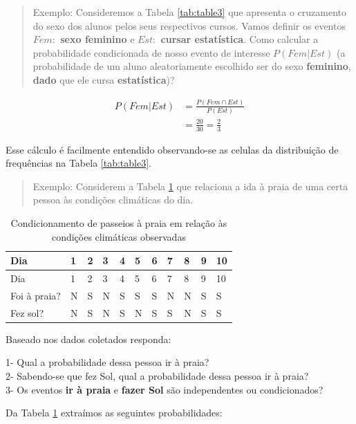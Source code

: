 \documentclass[
]{book}
\begin{document}
\hfill\break

\begin{quote}
Exemplo: Consideremos a Tabela \ref{tab:table3} que apresenta o cruzamento do sexo dos alunos pelos seus respectivos cursos. Vamos definir os eventos \textbf{\(Fem:\) sexo feminino} e \textbf{\(Est:\) cursar estatística}. Como calcular a probabilidade condicionada de nosso evento de interesse \textbf{\(P(Fem|Est)\)} (a probabilidade de um aluno aleatoriamente escolhido ser do sexo \textbf{feminino}, \textbf{dado} que ele cursa \textbf{estatística})?
\end{quote}

\begin{align*}
P(Fem|Est) & = \frac{ P(Fem \cap Est)}{ P(Est)} \\
           & = \frac{20}{30} = \frac{2}{3}    
\end{align*}

Esse cálculo é facilmente entendido observando-se as celulas da distribuição de frequências na Tabela \ref{tab:table3}.

\begin{quote}
Exemplo: Considerem a Tabela \ref{tab:table4} que relaciona a ida à praia de uma certa pessoa às condições climáticas do dia.
\end{quote}

\begin{longtable}[]{@{}lllllllllll@{}}
\caption{\label{tab:table4} Condicionamento de passeios à praia em relação às condições climáticas observadas}\tabularnewline
\toprule()
Dia & 1 & 2 & 3 & 4 & 5 & 6 & 7 & 8 & 9 & 10 \\
\midrule()
\endfirsthead
\toprule()
Dia & 1 & 2 & 3 & 4 & 5 & 6 & 7 & 8 & 9 & 10 \\
\midrule()
\endhead
Foi à praia? & N & S & N & S & S & S & N & N & S & S \\
Fez sol? & N & S & N & S & N & S & S & N & S & S \\
\bottomrule()
\end{longtable}

Baseado nos dados coletados responda:

1- Qual a probabilidade dessa pessoa ir à praia?\\
2- Sabendo-se que fez Sol, qual a probabilidade dessa pessoa ir à praia?\\
3- Os eventos \textbf{ir à praia} e \textbf{fazer Sol} são independentes ou condicionados?

Da Tabela \ref{tab:table4} extraímos as seguintes probabilidades:
\end{document}
